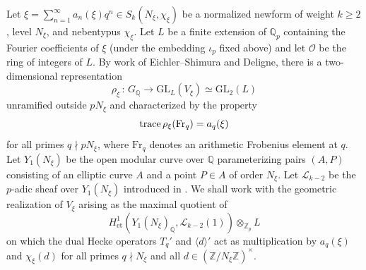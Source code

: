 \documentclass[a4paper,11pt]{amsart}
\theoremstyle{plain}
\theoremstyle{definition}
\theoremstyle{remark}
\newcommand{\bb}{\mathbb}
\newcommand{\cl}{\mathcal}
\DeclareMathOperator{\et}{et}
\newcommand{\Z}{\mathbb{Z}}
\newcommand{\GL}{\mathrm{GL}}
\newcommand{\Fr}{\mathrm{Fr}}
\numberwithin{equation}{section}
\begin{document}
Let $\xi=\sum_{n=1}^\infty a_n(\xi)q^n\in S_k(N_\xi,\chi_\xi)$ be a normalized newform of weight $k\geq 2$, level $N_\xi$, and nebentypus $\chi_\xi$. %
Let $L$ be a finite extension of $\bb{Q}_p$ containing the Fourier coefficients of $\xi$ (under the embedding $\iota_p$ fixed above) and let $\cl{O}$ be the ring of integers of $L$. By work of Eichler--Shimura and Deligne, there is a two-dimensional representation
$$
\rho_\xi\,:\,G_\mathbb Q\longrightarrow \GL_L(V_\xi)\simeq\GL_2(L)
$$
unramified outside $pN_\xi$ and characterized by the property
$$
{\rm trace}\,\rho_\xi(\Fr_{q})=a_{q}(\xi)
$$
for all primes $q\nmid pN_\xi$, where $\Fr_{q}$ denotes an arithmetic Frobenius element at $q$.
Let $Y_1(N_\xi)$ be the open modular curve over $\mathbb Q$ parameterizing pairs $(A,P)$ consisting of an elliptic curve $A$ and a point $P\in A$ of order $N_\xi$. Let $\mathscr{L}_{k-2}$ be the $p$-adic sheaf over $Y_1(N_\xi)$ introduced in \cite[\S2.3]{BSV}. We shall work with the geometric realization of $V_\xi$ arising as the maximal quotient of
\[
H^1_{\et}(Y_{1}(N_\xi)_{\overline{\mathbb Q}},\mathscr{L}_{k-2}(1))\otimes_{\Z_p}L
\]
on which the dual Hecke operators $T_q'$ and $\langle d\rangle'$ act as multiplication by $a_q(\xi)$ and $\chi_\xi(d)$ for all primes $q\nmid N_\xi$ and all $d\in(\Z/N_\xi\Z)^\times$. %


\end{document}
